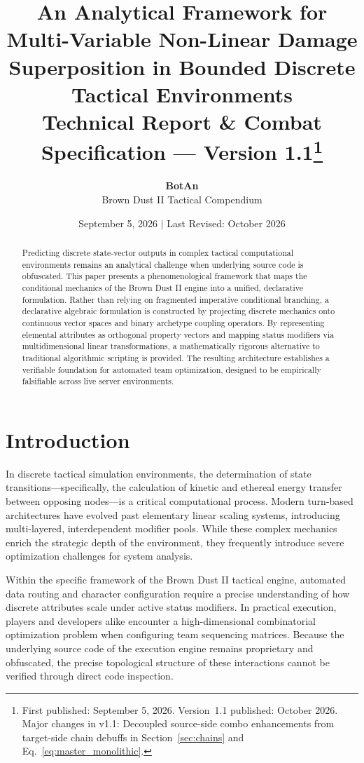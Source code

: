 \documentclass[twocolumn,10pt]{article}
\title{\textbf{An Analytical Framework for Multi-Variable Non-Linear Damage Superposition in Bounded Discrete Tactical Environments} \\
\large Technical Report \& Combat Specification --- Version 1.1\thanks{First published: September 5, 2026. Version~1.1 published: October 2026. Major changes in v1.1: Decoupled source-side combo enhancements from target-side chain debuffs in Section~\ref{sec:chains} and Eq.~\ref{eq:master_monolithic}.}}
\author{\textbf{BotAn} \\ \small Brown Dust II Tactical Compendium}
\date{September 5, 2026 \quad $\vert$ \quad \small Last Revised: October 2026}
\begin{document}
\raggedbottom

\maketitle

\begin{abstract}
Predicting discrete state-vector outputs in complex tactical computational environments remains an analytical challenge when underlying source code is obfuscated. This paper presents a phenomenological framework that maps the conditional mechanics of the Brown Dust II engine into a unified, declarative formulation. Rather than relying on fragmented imperative conditional branching, a declarative algebraic formulation is constructed by projecting discrete mechanics onto continuous vector spaces and binary archetype coupling operators. By representing elemental attributes as orthogonal property vectors and mapping status modifiers via multidimensional linear transformations, a mathematically rigorous alternative to traditional algorithmic scripting is provided. The resulting architecture establishes a verifiable foundation for automated team optimization, designed to be empirically falsifiable across live server environments.
\end{abstract}

\section{Introduction}
In discrete tactical simulation environments, the determination of state transitions—specifically, the calculation of kinetic and ethereal energy transfer between opposing nodes—is a critical computational process. Modern turn-based architectures have evolved past elementary linear scaling systems, introducing multi-layered, interdependent modifier pools. While these complex mechanics enrich the strategic depth of the environment, they frequently introduce severe optimization challenges for system analysis.

Within the specific framework of the Brown Dust II tactical engine, automated data routing and character configuration require a precise understanding of how discrete attributes scale under active status modifiers. In practical execution, players and developers alike encounter a high-dimensional combinatorial optimization problem when configuring team sequencing matrices. Because the underlying source code of the execution engine remains proprietary and obfuscated, the precise topological structure of these interactions cannot be verified through direct code inspection.
\end{document}
